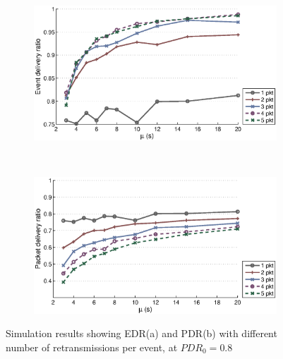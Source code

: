 \begin{figure}[p]
    \centering
    \begin{subfigure}[t]{0.9\textwidth}
        \centering
        \includegraphics[width=\textwidth] {../../sw/pc/matlab/simulation-result/retrans-count-edr-250evt-pdr0.8.eps}
        \caption{}
    \end{subfigure} 
    \\
    \begin{subfigure}[t]{0.9\textwidth}
        \centering
        \includegraphics[width=\textwidth] {../../sw/pc/matlab/simulation-result/retrans-count-pdr-250evt-pdr0.8.eps}
        \caption{}
    \end{subfigure}
    \caption[EDR and PDR with different transmission redundancy, $PDR_0 = 0.8$]{Simulation results showing EDR(a) and PDR(b) with different number of retransmissions per event, at $PDR_0 = 0.8$}\label{fig:retrans-lambda-0.8}
\end{figure}



